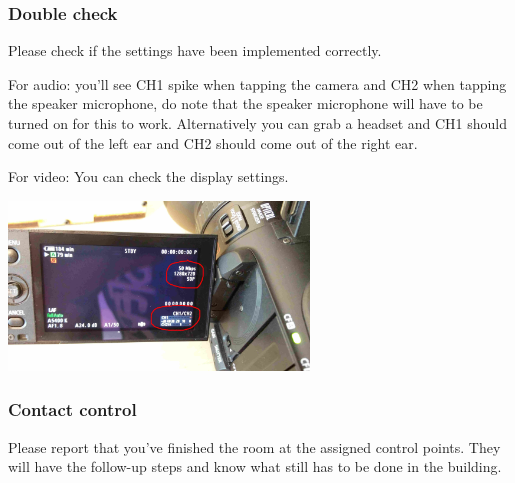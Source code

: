 \documentclass{article}
\begin{document}
\subsubsection{Double check}
Please check if the settings have been implemented correctly. 

For audio: you'll see CH1 spike when tapping the camera and CH2 when tapping the speaker microphone, do note that the speaker microphone will have to be turned on for this to work. Alternatively you can grab a headset and CH1 should come out of the left ear and CH2 should come out of the right ear.

For video: You can check the display settings.

\includegraphics[width = 80mm]{Canon06.jpg}

\subsubsection{Contact control}
Please report that you've finished the room at the assigned control points. They will have the follow-up steps and know what still has to be done in the building.
\end{document}

